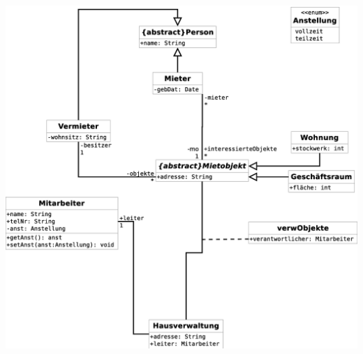 \documentclass[a4paper, 12pt, margins=2cm]{homework}
\begin{document}
  \begin{problem}
    
  \end{problem}
  \begin{solution}
    
  \end{solution}

\newpage

  \begin{problem}
    
  \end{problem}
  \begin{solution}\hfill

    \begin{center}
      \includegraphics[scale=0.4]{Aufgabe3.eps}
    \end{center}
    
  \end{solution}

\newpage
\end{document}
